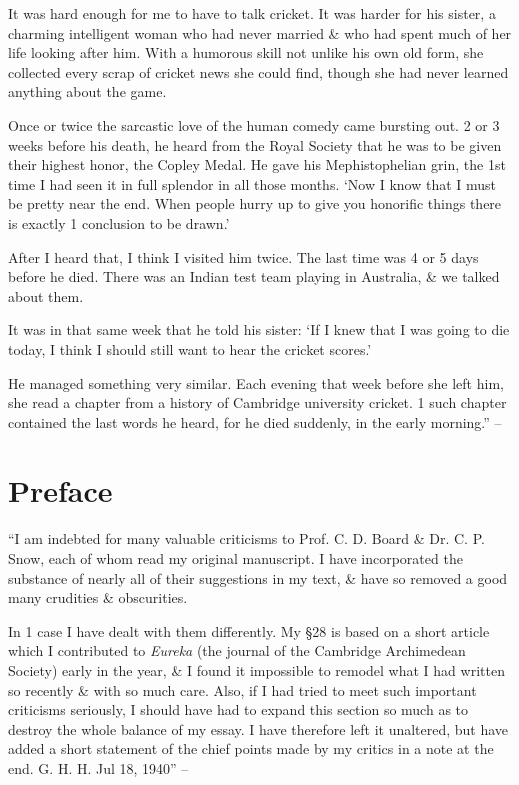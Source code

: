 \documentclass{article}
\numberwithin{equation}{section}
\begin{document}
It was hard enough for me to have to talk cricket. It was harder for his sister, a charming intelligent woman who had never married \& who had spent much of her life looking after him. With a humorous skill not unlike his own old form, she collected every scrap of cricket news she could find, though she had never learned anything about the game.

Once or twice the sarcastic love of the human comedy came bursting out. 2 or 3 weeks before his death, he heard from the Royal Society that he was to be given their highest honor, the Copley Medal. He gave his Mephistophelian grin, the 1st time I had seen it in full splendor in all those months. `Now I know that I must be pretty near the end. When people hurry up to give you honorific things there is exactly 1 conclusion to be drawn.'

After I heard that, I think I visited him twice. The last time was 4 or 5 days before he died. There was an Indian test team playing in Australia, \& we talked about them.

It was in that same week that he told his sister: `If I knew that I was going to die today, I think I should still want to hear the cricket scores.'

He managed something very similar. Each evening that week before she left him, she read a chapter from a history of Cambridge university cricket. 1 such chapter contained the last words he heard, for he died suddenly, in the early morning.'' -- \cite[pp. 9--58]{Hardy1992}


\section{Preface}
``I am indebted for many valuable criticisms to Prof. C. D. Board \& Dr. C. P. Snow, each of whom read my original manuscript. I have incorporated the substance of nearly all of their suggestions in my text, \& have so removed a good many crudities \& obscurities.

In 1 case I have dealt with them differently. My \S28 is based on a short article which I contributed to \textit{Eureka} (the journal of the Cambridge Archimedean Society) early in the year, \& I found it impossible to remodel what I had written so recently \& with so much care. Also, if I had tried to meet such important criticisms seriously, I should have had to expand this section so much as to destroy the whole balance of my essay. I have therefore left it unaltered, but have added a short statement of the chief points made by my critics in a note at the end. G. H. H. Jul 18, 1940'' -- \cite[p. 59]{Hardy1992}
\end{document}
